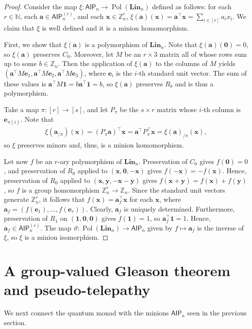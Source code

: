\documentclass[11pt]{article}
\newcommand{\N}{\mathbb N}
\newcommand{\Z}{\mathbb Z}
\newcommand{\Lin}{\mathbf{Lin}}
\newcommand{\AIP}{\mathsf{AIP}}
\DeclareMathOperator{\Pol}{Pol}
\newcommand{\bone}{\mathbf{1}}
\newcommand{\bzero}{\mathbf{0}}
\newcommand{\ba}{\mathbf{a}}
\newcommand{\bx}{\mathbf{x}}
\newcommand{\by}{\mathbf{y}}
\newcommand{\be}{\mathbf{e}}
\theoremstyle{plain}
\theoremstyle{definition}
\theoremstyle{remark}
\begin{document}
\begin{proof}
Consider the map $\xi: \AIP_n\to\Pol(\Lin_n)$ defined as follows: for each $r\in\N$, each $\ba\in\AIP_n^{(r)}$, and each $\bx\in\Z_n^r$, $\xi(\ba)(\bx)=\ba^\top\bx=\sum_{i\in[r]}a_ix_i$. We claim that $\xi$ is well defined and it is a minion homomorphism.

First, we show that $\xi(\ba)$ is a polymorphism of $\Lin_n$. Note that $\xi(\ba)(\bzero)=0$, so $\xi(\ba)$ preserves $C_0$. Moreover, let $M$ be an $r\times 3$ matrix all of whose rows sum up to some $b\in\Z_n$. Then the application of $\xi(\ba)$ to the columns of $M$ yields $(\ba^\top M\be_1,\ba^\top M\be_2,\ba^\top M\be_3)$, where $\be_i$ is the $i$-th standard unit vector. The sum of these values is $\ba^\top M\bone=b\ba^\top\bone=b$, so $\xi(\ba)$ preserves $R_b$ and is thus a polymorphism.

Take a map $\pi:[r]\to[s]$, and let $P_\pi$ be the $s\times r$ matrix whose $i$-th column is $\be_{\pi(i)}$. Note that
\begin{align*}
    \xi(\ba_{/\pi})(\bx)
    =
    (P_\pi\ba)^\top\bx=\ba^\top P_{\pi}^\top\bx=
    \xi(\ba)_{/\pi}(\bx),
\end{align*}
so $\xi$ preserves minors and, thus, is a minion homomorphism.

Let now $f$ be an $r$-ary polymorphism of $\Lin_n$. Preservation of $C_0$ gives $f(\bzero)=0$, and preservation of $R_0$ applied to $(\bx,\bzero,-\bx)$ gives $f(-\bx)=-f(\bx)$. Hence, preservation of $R_0$ applied to $(\bx,\by,-\bx-\by)$ gives $f(\bx+\by)=f(\bx)+f(\by)$, so $f$ is a group homomorphism $\Z_n^r\to\Z_n$. Since the standard unit vectors generate $\Z_n^r$, it follows that 
    $f(\bx)=\ba_f^\top\bx$ for each $\bx$, where $\ba_f=(f(\be_1),\dots,f(\be_r))$. Clearly, $\ba_f$ is uniquely determined. Furthermore, preservation of $R_1$ on $(\bone,\bzero,\bzero)$ gives $f(\bone)=1$, so $\ba_f^\top\bone=1$. Hence, $\ba_f\in\AIP_n^{(r)}$. The map $\vartheta:\Pol(\Lin_n)\to\AIP_n$ given by $f\mapsto \ba_f$  is the inverse of $\xi$, so $\xi$ is a minion isomorphism.
\end{proof}



\section{A group-valued Gleason theorem and pseudo-telepathy}

We next connect the quantum monad with the minions $\AIP_n$ seen in the previous section.
\end{document}
